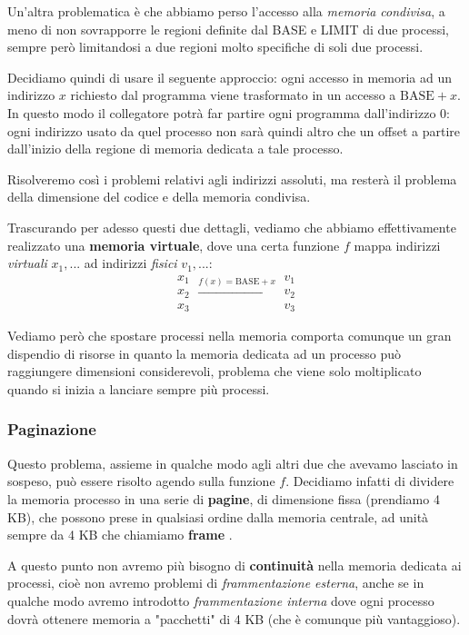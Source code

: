\documentclass[a4paper,11pt]{article}
\begin{document}
Un'altra problematica è che abbiamo perso l'accesso alla \textit{memoria condivisa}, a meno di non sovrapporre le regioni definite dal BASE e LIMIT di due processi, sempre però limitandosi a due regioni molto specifiche di soli due processi.

Decidiamo quindi di usare il seguente approccio: ogni accesso in memoria ad un indirizzo $x$ richiesto dal programma viene trasformato in un accesso a $\text{BASE} + x$.
In questo modo il collegatore potrà far partire ogni programma dall'indirizzo 0: ogni indirizzo usato da quel processo non sarà quindi altro che un offset a partire dall'inizio della regione di memoria dedicata a tale processo.

Risolveremo così i problemi relativi agli indirizzi assoluti, ma resterà il problema della dimensione del codice e della memoria condivisa.

Trascurando per adesso questi due dettagli, vediamo che abbiamo effettivamente realizzato una \textbf{memoria virtuale}, dove una certa funzione $f$ mappa indirizzi \textit{virtuali} $x_1, ...$ ad indirizzi \textit{fisici} $v_1, ...$:
$$
\begin{array}{c}
	x_1 \\ x_2 \\ x_3
\end{array}
\xrightarrow{f(x) = \text{BASE} + x}
\begin{array}{c}
	v_1 \\ v_2 \\ v_3
\end{array}
$$

Vediamo però che spostare processi nella memoria comporta comunque un gran dispendio di risorse in quanto la memoria dedicata ad un processo può raggiungere dimensioni considerevoli, problema che viene solo moltiplicato quando si inizia a lanciare sempre più processi.

\subsubsection{Paginazione}
Questo problema, assieme in qualche modo agli altri due che avevamo lasciato in sospeso, può essere risolto agendo sulla funzione $f$.
Decidiamo infatti di dividere la memoria processo in una serie di \textbf{pagine}, di dimensione fissa (prendiamo 4 KB), che possono prese in qualsiasi ordine dalla memoria centrale, ad unità sempre da 4 KB che chiamiamo \textbf{frame
}.

A questo punto non avremo più bisogno di \textbf{continuità} nella memoria dedicata ai processi, cioè non avremo problemi di \textit{frammentazione esterna}, anche se in qualche modo avremo introdotto \textit{frammentazione interna} dove ogni processo dovrà ottenere memoria a "pacchetti" di 4 KB (che è comunque più vantaggioso).
\end{document}
